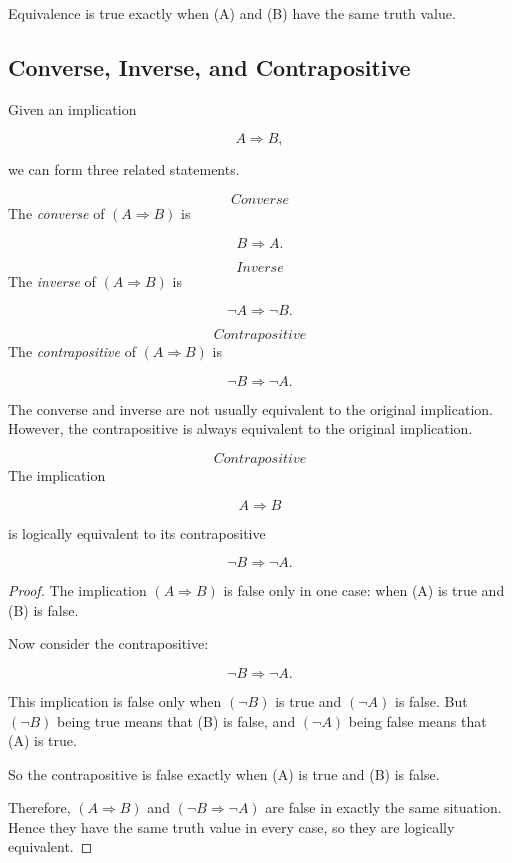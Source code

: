 Equivalence is true exactly when (A) and (B) have the same truth value.

\subsection{Converse, Inverse, and Contrapositive}

Given an implication

\[
A \Rightarrow B,
\]

we can form three related statements.

\begin{definition}\[Converse\]
The \emph{converse} of $(A \Rightarrow B)$ is

\[
B \Rightarrow A.
\]

\end{definition}

\begin{definition}\[Inverse\]
The \emph{inverse} of $(A \Rightarrow B)$ is

\[
\neg A \Rightarrow \neg B.
\]

\end{definition}

\begin{definition}\[Contrapositive\]
The \emph{contrapositive} of $(A \Rightarrow B)$ is

\[
\neg B \Rightarrow \neg A.
\]

\end{definition}

The converse and inverse are not usually equivalent to the original implication.
However, the contrapositive is always equivalent to the original implication.

\begin{theorem}\[Contrapositive\]
The implication

\[
A \Rightarrow B
\]

is logically equivalent to its contrapositive

\[
\neg B \Rightarrow \neg A.
\]

\end{theorem}

\begin{proof}
The implication $(A \Rightarrow B)$ is false only in one case: when (A) is true
and (B) is false.

Now consider the contrapositive:

\[
\neg B \Rightarrow \neg A.
\]

This implication is false only when $(\neg B)$ is true and $(\neg A)$ is false.
But $(\neg B)$ being true means that (B) is false, and $(\neg A)$ being false
means that (A) is true.

So the contrapositive is false exactly when (A) is true and (B) is false.

Therefore, $(A \Rightarrow B)$ and $(\neg B \Rightarrow \neg A)$ are false in
exactly the same situation. Hence they have the same truth value in every case,
so they are logically equivalent.
\end{proof}

